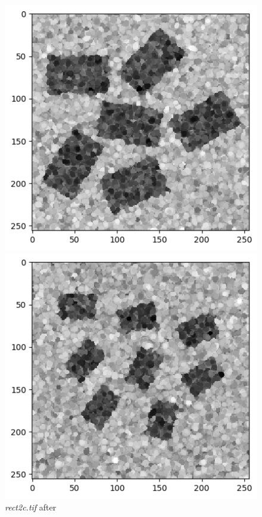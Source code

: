 \documentclass[runningheads]{llncs}
\begin{document}
\begin{figure}[h!]
\begin{minipage}[h]{0.47\linewidth}
\begin{center}
\includegraphics[width=1\linewidth]{Report/Result_Images/image_kc6.png} 
\caption{\emph{rect2c.tif} after}
\label{kc6-Kuwahara and Kernel 5}
\end{center}
\end{minipage}
\vfill
\vspace{0.2 cm}
\begin{minipage}[h]{0.47\linewidth}
\begin{center}
\includegraphics[width=1\linewidth]{Report/Result_Images/image_kc7.png} 

\end{center}
\end{minipage}
\end{figure}
\end{document}
